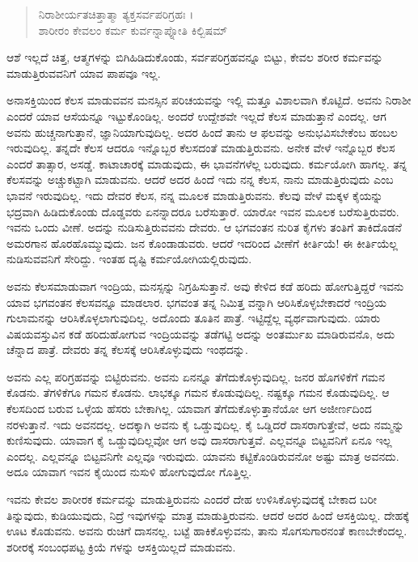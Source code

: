 \begin{verse}
ನಿರಾಶೀರ್ಯತಚಿತ್ತಾತ್ಮಾ ತ್ಯಕ್ತಸರ್ವಪರಿಗ್ರಹಃ ।\\ಶಾರೀರಂ ಕೇವಲಂ ಕರ್ಮ ಕುರ್ವನ್ನಾಪ್ನೋತಿ ಕಿಲ್ಬಿಷಮ್ 
\end{verse}

{\small ಆಶೆ ಇಲ್ಲದೆ ಚಿತ್ತ, ಆತ್ಮಗಳನ್ನು ಬಿಗಿಹಿಡಿದುಕೊಂಡು, ಸರ್ವಪರಿಗ್ರಹವನ್ನೂ ಬಿಟ್ಟು, ಕೇವಲ ಶರೀರ ಕರ್ಮವನ್ನು ಮಾಡುತ್ತಿರುವವನಿಗೆ ಯಾವ ಪಾಪವೂ ಇಲ್ಲ.}

ಅನಾಸಕ್ತಿಯಿಂದ ಕೆಲಸ ಮಾಡುವವನ ಮನಸ್ಸಿನ ಪರಿಚಯವನ್ನು ಇಲ್ಲಿ ಮತ್ತೂ ವಿಶಾಲವಾಗಿ ಕೊಟ್ಟಿದೆ. ಅವನು ನಿರಾಶೀ ಎಂದರೆ ಯಾವ ಆಸೆಯನ್ನೂ ಇಟ್ಟುಕೊಂಡಿಲ್ಲ. ಅಂದರೆ ಉದ್ದೇಶವೇ ಇಲ್ಲದೆ ಕೆಲಸ ಮಾಡುತ್ತಾನೆ ಎಂದಲ್ಲ. ಆಗ ಅವನು ಹುಚ್ಚನಾಗುತ್ತಾನೆ, ಜ್ಞಾನಿಯಾಗುವುದಿಲ್ಲ. ಅದರ ಹಿಂದೆ ತಾನು ಆ ಫಲವನ್ನು ಅನುಭವಿಸಬೇಕೆಂಬ ಹಂಬಲ ಇರುವುದಿಲ್ಲ. ತನ್ನದೇ ಕೆಲಸ ಆದರೂ ಇನ್ನೊಬ್ಬರ ಕೆಲಸದಂತೆ ಮಾಡುತ್ತಿರುವನು. ಅನೇಕ ವೇಳೆ ಇನ್ನೊಬ್ಬರ ಕೆಲಸ ಎಂದರೆ ತಾತ್ಸಾರ, ಅಸಡ್ಡೆ. ಕಾಟಾಚಾರಕ್ಕೆ ಮಾಡುವುದು, ಈ ಭಾವನೆಗಳೆಲ್ಲ ಬರುವುದು. ಕರ್ಮಯೋಗಿ ಹಾಗಲ್ಲ. ತನ್ನ ಕೆಲಸವನ್ನು ಅಚ್ಚುಕಟ್ಟಾಗಿ ಮಾಡುವನು. ಆದರೆ ಅದರ ಹಿಂದೆ ಇದು ನನ್ನ ಕೆಲಸ, ನಾನು ಮಾಡುತ್ತಿರುವುದು ಎಂಬ ಭಾವನೆ ಇರುವುದಿಲ್ಲ. ಇದು ದೇವರ ಕೆಲಸ, ನನ್ನ ಮೂಲಕ ಮಾಡುತ್ತಿರುವನು. ಕೆಲವು ವೇಳೆ ಮಕ್ಕಳ ಕೈಯನ್ನು ಭದ್ರವಾಗಿ ಹಿಡಿದುಕೊಂಡು ದೊಡ್ಡವರು ಏನನ್ನಾದರೂ ಬರೆಸುತ್ತಾರೆ. ಯಾರೋ ಇವನ ಮೂಲಕ ಬರೆಸುತ್ತಿರುವರು. ಇವನು ಒಂದು ವೀಣೆ. ಅದನ್ನು ನುಡಿಸುತ್ತಿರುವವನು ದೇವರು. ಆ ಭಗವಂತನ ನುರಿತ ಕೈಗಳು ತಂತಿಗೆ ತಾಕಿದೊಡನೆ ಅಮರಗಾನ ಹೊರಹೊಮ್ಮುವುದು. ಜನ ಕೊಂಡಾಡುವರು. ಆದರೆ ಇದರಿಂದ ವೀಣೆಗೆ ಕೀರ್ತಿಯೆ! ಈ ಕೀರ್ತಿಯೆಲ್ಲ ನುಡಿಸುವವನಿಗೆ ಸೇರಿದ್ದು. ಇಂತಹ ದೃಷ್ಟಿ ಕರ್ಮಯೋಗಿಯಲ್ಲಿರುವುದು.

ಅವನು ಕೆಲಸಮಾಡುವಾಗ ಇಂದ್ರಿಯ, ಮನಸ್ಸನ್ನು ನಿಗ್ರಹಿಸುತ್ತಾನೆ. ಅವು ಕೇಳಿದ ಕಡೆ ಹರಿದು ಹೋಗುತ್ತಿದ್ದರೆ ಇವನು ಯಾವ ಭಗವಂತನ ಕೆಲಸವನ್ನೂ ಮಾಡಲಾರ. ಭಗವಂತ ತನ್ನ ನಿಮಿತ್ತ ವನ್ನಾಗಿ ಆರಿಸಿಕೊಳ್ಳಬೇಕಾದರೆ ಇಂದ್ರಿಯ ಗುಲಾಮನನ್ನು ಆರಿಸಿಕೊಳ್ಳಲಾಗುವುದಿಲ್ಲ. ಅದೊಂದು ತೂತಿನ ಪಾತ್ರೆ. ಇಟ್ಟಿದ್ದೆಲ್ಲ ವ್ಯರ್ಥವಾಗುವುದು. ಯಾರು ವಿಷಯವಸ್ತುವಿನ ಕಡೆ ಹರಿದುಹೋಗುವ ಇಂದ್ರಿಯವನ್ನು ತಡೆಗಟ್ಟಿ ಅದನ್ನು ಅಂತರ್ಮುಖ ಮಾಡಿರುವನೊ, ಅದು ಚೆನ್ನಾದ ಪಾತ್ರೆ. ದೇವರು ತನ್ನ ಕೆಲಸಕ್ಕೆ ಆರಿಸಿಕೊಳ್ಳುವುದು ಇಂಥದನ್ನು.

ಅವನು ಎಲ್ಲ ಪರಿಗ್ರಹವನ್ನು ಬಿಟ್ಟಿರುವನು. ಅವನು ಏನನ್ನೂ ತೆಗೆದುಕೊಳ್ಳುವುದಿಲ್ಲ. ಜನರ ಹೊಗಳಿಕೆಗೆ ಗಮನ ಕೊಡನು. ತೆಗಳಿಕೆಗೂ ಗಮನ ಕೊಡನು. ಲಾಭಕ್ಕೂ ಗಮನ ಕೊಡುವುದಿಲ್ಲ. ನಷ್ಟಕ್ಕೂ ಗಮನ ಕೊಡುವುದಿಲ್ಲ. ಆ ಕೆಲಸದಿಂದ ಬರುವ ಒಳ್ಳೆಯ ಹೆಸರು ಬೇಕಾಗಿಲ್ಲ. ಯಾವಾಗ ತೆಗೆದುಕೊಳ್ಳುತ್ತಾನೆಯೋ ಆಗ ಅಜೀರ್ಣದಿಂದ ನರಳುತ್ತಾನೆ. ಇದು ಅವನದಲ್ಲ. ಅದಕ್ಕಾಗಿ ಅವನು ಕೈ ಒಡ್ಡುವುದಿಲ್ಲ. ಕೈ ಒಡ್ಡಿದರೆ ದಾಸರಾಗುತ್ತೇವೆ, ಅದು ನಮ್ಮನ್ನು ಕುಣಿಸುವುದು. ಯಾವಾಗ ಕೈ ಒಡ್ಡುವುದಿಲ್ಲವೋ ಆಗ ಅವು ದಾಸರಾಗುತ್ತವೆ. ಎಲ್ಲವನ್ನೂ ಬಿಟ್ಟವನಿಗೆ ಏನೂ ಇಲ್ಲ ಎಂದಲ್ಲ. ಎಲ್ಲವನ್ನೂ ಬಿಟ್ಟವನಿಗೇ ಎಲ್ಲವೂ ಇರುವುದು. ಯಾವನು ಕಟ್ಟಿಕೊಂಡಿರುವನೋ ಅಷ್ಟು ಮಾತ್ರ ಅವನದು. ಅದೂ ಯಾವಾಗ ಇವನ ಕೈಯಿಂದ ನುಸುಳಿ ಹೋಗುವುದೋ ಗೊತ್ತಿಲ್ಲ.

ಇವನು ಕೇವಲ ಶಾರೀರಕ ಕರ್ಮವನ್ನು ಮಾಡುತ್ತಿರುವನು ಎಂದರೆ ದೇಹ ಉಳಿಸಿಕೊಳ್ಳುವುದಕ್ಕೆ ಬೇಕಾದ ಬರೀ ತಿನ್ನುವುದು, ಕುಡಿಯುವುದು, ನಿದ್ರೆ ಇವುಗಳನ್ನು ಮಾತ್ರ ಮಾಡುತ್ತಿರುವನು. ಆದರೆ ಅದರ ಹಿಂದೆ ಆಸಕ್ತಿಯಿಲ್ಲ. ದೇಹಕ್ಕೆ ಊಟ ಕೊಡುವನು. ಅವನು ರುಚಿಗೆ ದಾಸನಲ್ಲ. ಬಟ್ಟೆ ಹಾಕಿಕೊಳ್ಳುವನು, ತಾನು ಸೊಗಸುಗಾರನಂತೆ ಕಾಣಬೇಕೆಂದಲ್ಲ. ಶರೀರಕ್ಕೆ ಸಂಬಂಧಪಟ್ಟ ಕ್ರಿಯೆ ಗಳನ್ನು ಆಸಕ್ತಿಯಿಲ್ಲದೆ ಮಾಡುವನು.

